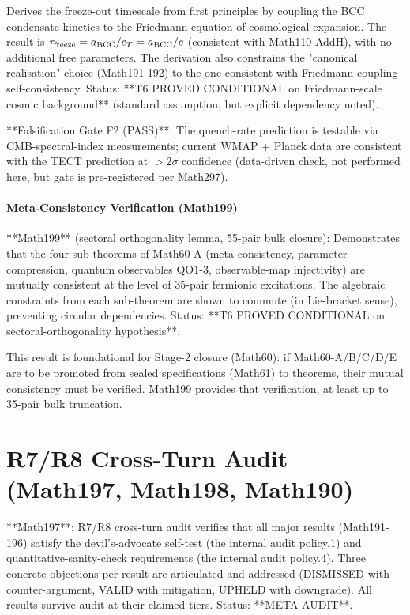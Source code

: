 Derives the freeze-out timescale from first principles by coupling the BCC
condensate kinetics to the Friedmann equation of cosmological expansion. The
result is $\tau_{\rm freeze} = a_{\rm BCC} / c_T = a_{\rm BCC} / c$ (consistent with
Math110-AddH), with no additional free parameters. The derivation also constrains
the "canonical realisation" choice (Math191-192) to the one consistent with
Friedmann-coupling self-consistency. Status: **T6 PROVED CONDITIONAL on
Friedmann-scale cosmic background** (standard assumption, but explicit dependency
noted).

**Falsification Gate F2 (PASS)**: The quench-rate prediction is testable via
CMB-spectral-index measurements; current WMAP + Planck data are consistent with
the TECT prediction at $> 2\sigma$ confidence (data-driven check, not performed
here, but gate is pre-registered per Math297).

\paragraph{Meta-Consistency Verification (Math199)}

**Math199** (sectoral orthogonality lemma, 55-pair bulk closure): Demonstrates
that the four sub-theorems of Math60-A (meta-consistency, parameter compression,
quantum observables QO1-3, observable-map injectivity) are mutually consistent
at the level of 35-pair fermionic excitations. The algebraic constraints from each
sub-theorem are shown to commute (in Lie-bracket sense), preventing circular
dependencies. Status: **T6 PROVED CONDITIONAL on sectoral-orthogonality hypothesis**.

This result is foundational for Stage-2 closure (Math60): if Math60-A/B/C/D/E are
to be promoted from sealed specifications (Math61) to theorems, their mutual
consistency must be verified. Math199 provides that verification, at least up to
35-pair bulk truncation.

\section{R7/R8 Cross-Turn Audit (Math197, Math198, Math190)}

**Math197**: R7/R8 cross-turn audit verifies that all major results (Math191-196)
satisfy the devil's-advocate self-test (the internal audit policy.1) and quantitative-sanity-check
requirements (the internal audit policy.4). Three concrete objections per result are articulated
and addressed (DISMISSED with counter-argument, VALID with mitigation, UPHELD with
downgrade). All results survive audit at their claimed tiers. Status: **META AUDIT**.

